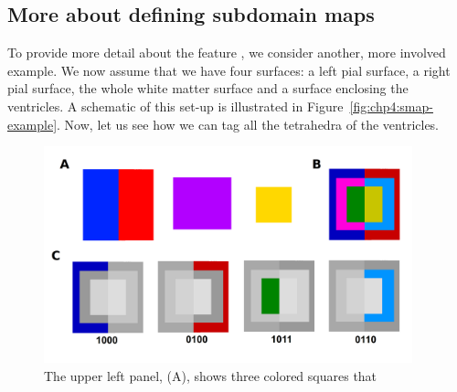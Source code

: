\subsection{More about defining \svmtk{} subdomain maps}  
\label{chp4:subdomains}
To provide more detail about the \svmtk{} feature
, we consider another, more involved
example. We now assume that we have four surfaces: a left pial
surface, a right pial surface, the whole white matter surface and a
surface enclosing the ventricles. A schematic of this set-up is
illustrated in Figure~\ref{fig:chp4:smap-example}. Now, let us see how
we can tag all the tetrahedra of the ventricles.
\begin{figure}[t]
  \includegraphics[width=0.95\textwidth]{./graphics/chp4/dot.png}
  \caption{The upper left panel, (A), shows three colored squares that 
}
\end{figure}
